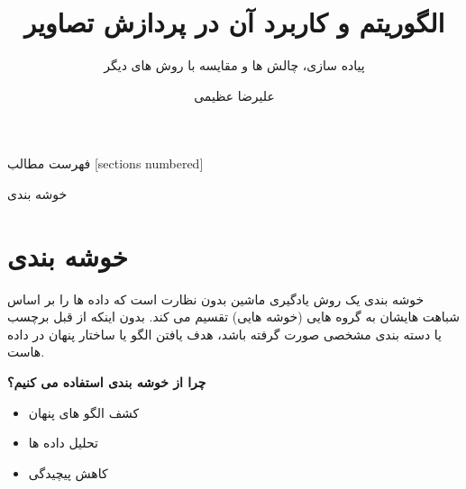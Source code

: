 \documentclass[10pt]{beamer}
\title{الگوریتم \lr{ Fuzzy c-means}
و کاربرد آن در پردازش تصاویر
}
\subtitle{پیاده سازی، چالش ها و مقایسه با روش های دیگر}
\author{علیرضا عظیمی }
\date{ }
\begin{document}
	
\begin{frame}[plain]
		\maketitle
\end{frame}
	

\begin{frame}{فهرست مطالب}
	[sections numbered]
	\tableofcontents[hideallsubsections]
\end{frame}

\begin{frame}{خوشه بندی }

\section{خوشه بندی }

خوشه بندی  یک روش یادگیری ماشین بدون نظارت است که داده ها را بر اساس شباهت هایشان به گروه هایی (خوشه هایی) تقسیم می کند. بدون اینکه از قبل برچسب یا دسته بندی مشخصی صورت گرفته باشد، هدف یافتن الگو یا ساختار پنهان در داده هاست.

\textbf{چرا از خوشه بندی استفاده می کنیم؟}

\begin{itemize}
	\item 
کشف الگو های پنهان
	\item 
تحلیل داده ها
	\item 
کاهش پیچیدگی 
\end{itemize}

\end{frame}
\end{document}
